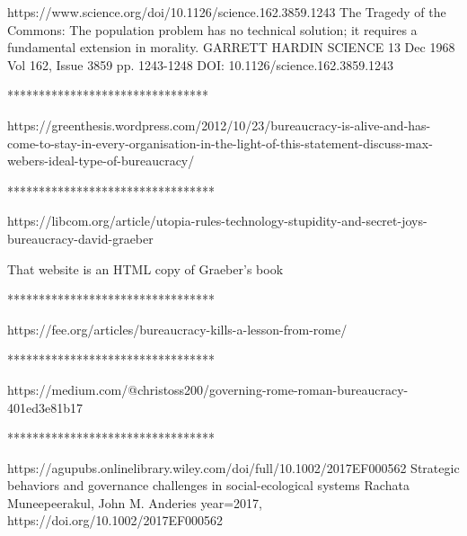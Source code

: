 https://www.science.org/doi/10.1126/science.162.3859.1243
The Tragedy of the Commons: The population problem has no technical solution; it requires a fundamental extension in morality.
GARRETT HARDIN
SCIENCE
13 Dec 1968
Vol 162, Issue 3859
pp. 1243-1248
DOI: 10.1126/science.162.3859.1243

********************************

https://greenthesis.wordpress.com/2012/10/23/bureaucracy-is-alive-and-has-come-to-stay-in-every-organisation-in-the-light-of-this-statement-discuss-max-webers-ideal-type-of-bureaucracy/

*********************************

https://libcom.org/article/utopia-rules-technology-stupidity-and-secret-joys-bureaucracy-david-graeber

That website is an HTML copy of Graeber's book

*********************************

https://fee.org/articles/bureaucracy-kills-a-lesson-from-rome/

*********************************

https://medium.com/@christoss200/governing-rome-roman-bureaucracy-401ed3e81b17

*********************************

https://agupubs.onlinelibrary.wiley.com/doi/full/10.1002/2017EF000562
Strategic behaviors and governance challenges in social-ecological systems
Rachata Muneepeerakul, John M. Anderies
year={2017},
https://doi.org/10.1002/2017EF000562